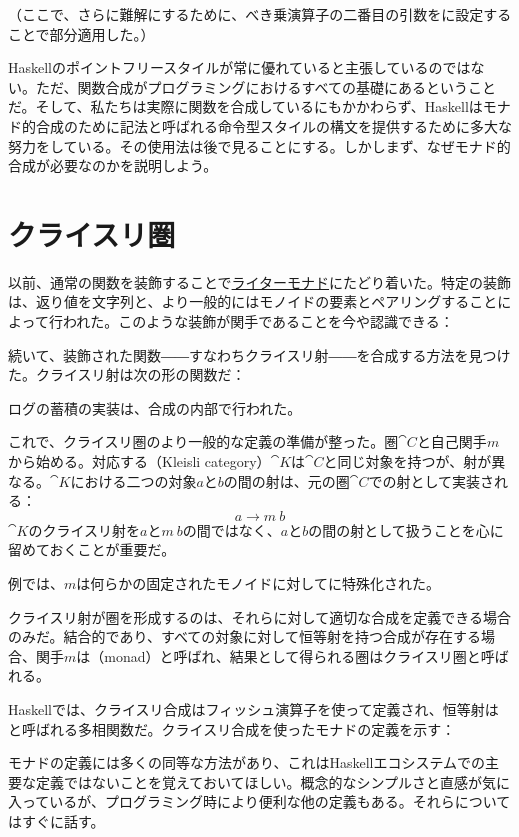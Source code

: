 （ここで、さらに難解にするために、べき乗演算子\code{(\^{})}の二番目の引数をに設定することで部分適用した。）

Haskellのポイントフリースタイルが常に優れていると主張しているのではない。ただ、関数合成がプログラミングにおけるすべての基礎にあるということだ。そして、私たちは実際に関数を合成しているにもかかわらず、Haskellはモナド的合成のために記法と呼ばれる命令型スタイルの構文を提供するために多大な努力をしている。その使用法は後で見ることにする。しかしまず、なぜモナド的合成が必要なのかを説明しよう。

\section{クライスリ圏}

以前、通常の関数を装飾することで\hyperref[kleisli-categories]{ライターモナド}にたどり着いた。特定の装飾は、返り値を文字列と、より一般的にはモノイドの要素とペアリングすることによって行われた。このような装飾が関手であることを今や認識できる：

続いて、装飾された関数――すなわちクライスリ射――を合成する方法を見つけた。クライスリ射は次の形の関数だ：

ログの蓄積の実装は、合成の内部で行われた。

これで、クライスリ圏のより一般的な定義の準備が整った。圏$\cat{C}$と自己関手$m$から始める。対応する（Kleisli category）$\cat{K}$は$\cat{C}$と同じ対象を持つが、射が異なる。$\cat{K}$における二つの対象$a$と$b$の間の射は、元の圏$\cat{C}$での射として実装される：
\[a \to m\ b\]
$\cat{K}$のクライスリ射を$a$と$m\ b$の間ではなく、$a$と$b$の間の射として扱うことを心に留めておくことが重要だ。

例では、$m$は何らかの固定されたモノイドに対してに特殊化された。

クライスリ射が圏を形成するのは、それらに対して適切な合成を定義できる場合のみだ。結合的であり、すべての対象に対して恒等射を持つ合成が存在する場合、関手$m$は（monad）と呼ばれ、結果として得られる圏はクライスリ圏と呼ばれる。

Haskellでは、クライスリ合成はフィッシュ演算子\code{>=>}を使って定義され、恒等射はと呼ばれる多相関数だ。クライスリ合成を使ったモナドの定義を示す：

モナドの定義には多くの同等な方法があり、これはHaskellエコシステムでの主要な定義ではないことを覚えておいてほしい。概念的なシンプルさと直感が気に入っているが、プログラミング時により便利な他の定義もある。それらについてはすぐに話す。

